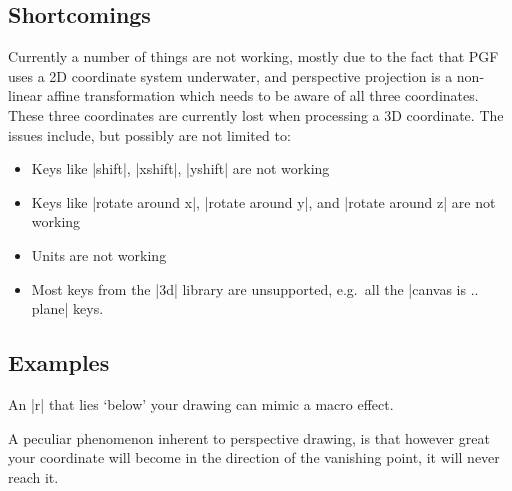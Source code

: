 \subsection{Shortcomings}

Currently a number of things are not working, mostly due to the fact that PGF
uses a 2D coordinate system underwater, and perspective projection is a
non-linear affine transformation which needs to be aware of all three
coordinates. These three coordinates are currently lost when processing a 3D
coordinate.
The issues include, but possibly are not limited to:
%
\begin{itemize}
    \item Keys like |shift|, |xshift|, |yshift| are not working
    \item Keys like |rotate around x|, |rotate around y|, and |rotate around z|
      are not working
    \item Units are not working
    \item Most keys from the |3d| library are unsupported, e.g.\ all the
        |canvas is .. plane| keys.
\end{itemize}


\subsection{Examples}

An |r| that lies `below' your drawing can mimic a macro effect.
%
\nopagebreak
\begin{codeexample}[preamble={\usetikzlibrary{perspective}}]
\begin{tikzpicture}[
  isometric view,
  perspective={
    p = {(8,0,0)},
    q = {(0,8,0)},
    r = {(0,0,-8)}}]

  \simplecuboid{2}{2}{2}]

\end{tikzpicture}
\end{codeexample}

A peculiar phenomenon inherent to perspective drawing, is that however great
your coordinate will become in the direction of the vanishing point, it will
never reach it.
%
\nopagebreak
\begin{codeexample}[preamble={\usetikzlibrary{perspective}}]
\end{codeexample}

